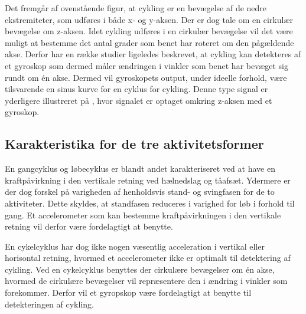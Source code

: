 Det fremgår af ovenstående figur, at cykling er en bevægelse af de nedre ekstremiteter, som udføres i både x- og y-aksen. Der er dog tale om en cirkulær bevægelse om z-aksen. \newline
Idet cykling udføres i en cirkulær bevægelse vil det være muligt at bestemme det antal grader som benet har roteret om den pågældende akse. Derfor har en række studier ligeledes beskrevet, at cykling kan detekteres af et gyroskop som dermed måler ændringen i vinkler som benet har bevæget sig rundt om én akse. Dermed vil gyroskopets output, under ideelle forhold, være tilsvarende en sinus kurve for en cyklus for cykling. \citep{Cockcroft2011,Marin-PerianuMarin-Perianu2013} Denne type signal er yderligere illustreret på , hvor signalet er optaget omkring z-aksen med et gyroskop.



\subsection{Karakteristika for de tre aktivitetsformer}
En gangcyklus og løbecyklus er blandt andet karakteriseret ved at have en kraftpåvirkning i den vertikale retning ved hælnedslag og tåafsæt. Ydermere er der dog forskel på varigheden af henholdsvis stand- og svingfasen for de to aktiviteter. Dette skyldes, at standfasen reduceres i varighed for løb i forhold til gang. \newline
Et accelerometer som kan bestemme kraftpåvirkningen i den vertikale retning vil derfor være fordelagtigt at benytte. \citep{Lee1998,Rueterbories2010}

En cykelcyklus har dog ikke nogen væsentlig acceleration i vertikal eller horisontal retning, hvormed et accelerometer ikke er optimalt til detektering af cykling. Ved en cykelcyklus benyttes der cirkulære bevægelser om én akse, hvormed de cirkulære bevægelser vil repræsentere den i ændring i vinkler som forekommer. Derfor vil et gyropskop være fordelagtigt at benytte til detekteringen af cykling.  \citep{Cockcroft2011,Marin-PerianuMarin-Perianu2013}


